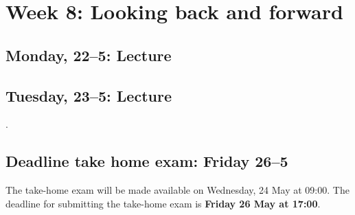 \section*{Week 8: Looking back and forward}

\subsection*{Monday, 22--5: Lecture}

\subsection*{Tuesday, 23--5: Lecture}
. \\

\subsection*{Deadline take home exam: Friday 26--5}
The take-home exam will be made available on Wednesday, 24 May at 09:00. The deadline for submitting the take-home exam is \textbf{Friday 26 May at 17:00}.







